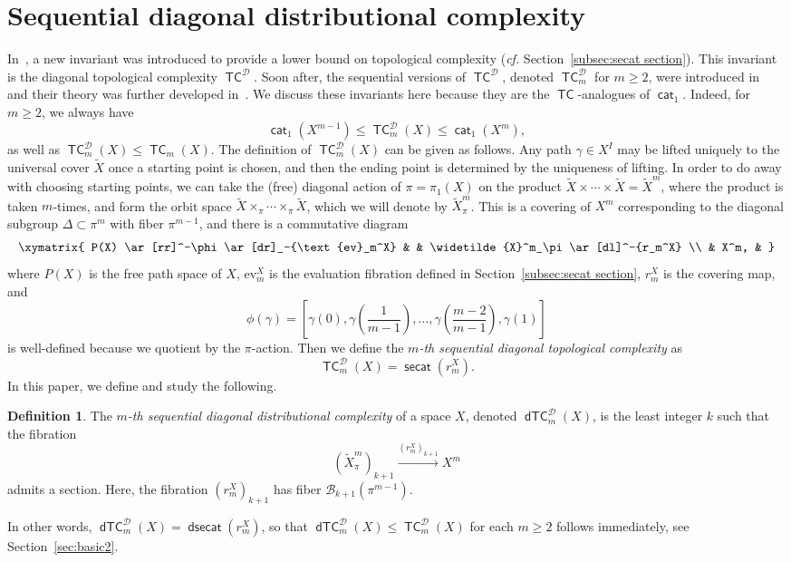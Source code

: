 \documentclass[amscd,amssymb,verbatim,11pt]{amsart}
\theoremstyle{plain}
\theoremstyle{definition}
\newtheorem{definition}[thm]{Definition}
\newcommand{\Wi}{\widetilde}
\DeclareMathOperator{\cat}{{\mathsf{cat}}}
\DeclareMathOperator{\TC}{{\mathsf{TC}}}
\DeclareMathOperator{\secat}{{\mathsf{secat}}}
\DeclareMathOperator{\dsecat}{{\mathsf{dsecat}}}
\DeclareMathOperator{\dTC}{{\mathsf{dTC}}}
\newcommand{\D}{\mathcal{D}}
\def\scr{\mathcal}
\def\B{{\scr B}}
\begin{document}
\section{Sequential diagonal distributional complexity}\label{sec: diag distrib TC}
In~\cite{FGLO1, FGLO2}, a new invariant was introduced to provide a lower bound on topological complexity (\emph{cf.} Section~\ref{subsec:secat section}). This invariant is the diagonal topological complexity $\TC^{\D}$. Soon after, the sequential versions of $\TC^{\D}$, denoted $\TC^{\D}_m$ for $m\ge 2$, were introduced in~\cite{FO} and their theory was further developed in~\cite{PS}. We discuss these invariants here because they are the $\TC$-analogues of $\cat_1$. 
Indeed, for $m\ge 2$, we always have
\begin{equation}\label{five}
 \cat_1(X^{m-1})\le\TC^{\D}_m(X)\le\cat_1(X^m),   
\end{equation}
as well as $\TC_m^{\D}(X) \leq \TC_m(X)$. The definition of $\TC_m^{\D}(X)$ can be given as follows. Any path $\gamma\in X^I$ may
be lifted uniquely to the universal cover $\widetilde X$ once a starting point is chosen, and then the ending point
is determined by the uniqueness of lifting. In order to do away with choosing starting points, we can take the 
(free) diagonal action of $\pi=\pi_1(X)$ on the product $\widetilde X \times \cdots \times \widetilde X=\Wi{X}^m$, where the product is taken $m$-times, and form the orbit space
$\widetilde X \times_\pi \cdots\times_\pi \widetilde X$, which we will denote by $\Wi{X}^m_\pi$. This is a covering of $X^m$ corresponding to the diagonal subgroup $\Delta\subset \pi^m$ with fiber $\pi^{m-1}$, and there is a commutative diagram 
\begin{equation}\label{eq: diag 1}
    \xymatrix{
P(X) \ar[rr]^-\phi \ar[dr]_-{\text{ev}_m^X} & & \Wi{X}^m_\pi \ar[dl]^-{r_m^X} \\
& X^m, &
}
\end{equation}
where $P(X)$ is the free path space of $X$, $\text{ev}^X_m$ is the evaluation fibration defined in Section~\ref{subsec:secat section}, $r^X_m$ is the covering map, and
\[
\phi(\gamma) = \left[\gamma(0),\gamma\left(\frac{1}{m-1}\right),\ldots,\gamma\left(\frac{m-2}{m-1}\right),\gamma(1)\right]
\]
is well-defined because we quotient by the $\pi$-action. Then we define the $m$\emph{-th sequential diagonal topological complexity} as
\[
\TC_m^{\D}(X) = \secat(r_m^X).
\]
In this paper, we define and study the following.

\begin{definition}\label{def:dTCD}
The $m$\emph{-th sequential diagonal distributional complexity} of a space $X$, denoted $\dTC_m^{\D}(X)$, is the least integer $k$ such that the
fibration 
\[
(\Wi{X}^m_\pi)_{k+1} \xrightarrow{(r_m^X)_{k+1}} X^m
\]
admits a section. Here, the fibration $(r_m^X)_{k+1}$ has fiber $\B_{k+1}(\pi^{m-1})$.
\end{definition}
In other words, $\dTC_m^{\D}(X)=\dsecat(r_m^X)$, so that $\dTC_m^{\D}(X)\le\TC_m^{\D}(X)$ for each $m\ge 2$ follows immediately, see Section~\ref{sec:basic2}. 
\end{document}
